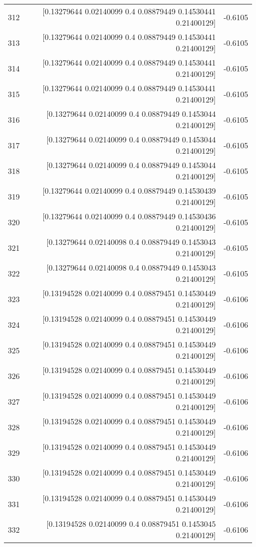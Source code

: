 \begin{longtable}{lrr}
312 & [0.13279644 0.02140099 0.4        0.08879449 0.14530441 0.21400129] & -0.6105 \\
313 & [0.13279644 0.02140099 0.4        0.08879449 0.14530441 0.21400129] & -0.6105 \\
314 & [0.13279644 0.02140099 0.4        0.08879449 0.14530441 0.21400129] & -0.6105 \\
315 & [0.13279644 0.02140099 0.4        0.08879449 0.14530441 0.21400129] & -0.6105 \\
316 & [0.13279644 0.02140099 0.4        0.08879449 0.1453044  0.21400129] & -0.6105 \\
317 & [0.13279644 0.02140099 0.4        0.08879449 0.1453044  0.21400129] & -0.6105 \\
318 & [0.13279644 0.02140099 0.4        0.08879449 0.1453044  0.21400129] & -0.6105 \\
319 & [0.13279644 0.02140099 0.4        0.08879449 0.14530439 0.21400129] & -0.6105 \\
320 & [0.13279644 0.02140099 0.4        0.08879449 0.14530436 0.21400129] & -0.6105 \\
321 & [0.13279644 0.02140098 0.4        0.08879449 0.1453043  0.21400129] & -0.6105 \\
322 & [0.13279644 0.02140098 0.4        0.08879449 0.1453043  0.21400129] & -0.6105 \\
323 & [0.13194528 0.02140099 0.4        0.08879451 0.14530449 0.21400129] & -0.6106 \\
324 & [0.13194528 0.02140099 0.4        0.08879451 0.14530449 0.21400129] & -0.6106 \\
325 & [0.13194528 0.02140099 0.4        0.08879451 0.14530449 0.21400129] & -0.6106 \\
326 & [0.13194528 0.02140099 0.4        0.08879451 0.14530449 0.21400129] & -0.6106 \\
327 & [0.13194528 0.02140099 0.4        0.08879451 0.14530449 0.21400129] & -0.6106 \\
328 & [0.13194528 0.02140099 0.4        0.08879451 0.14530449 0.21400129] & -0.6106 \\
329 & [0.13194528 0.02140099 0.4        0.08879451 0.14530449 0.21400129] & -0.6106 \\
330 & [0.13194528 0.02140099 0.4        0.08879451 0.14530449 0.21400129] & -0.6106 \\
331 & [0.13194528 0.02140099 0.4        0.08879451 0.14530449 0.21400129] & -0.6106 \\
332 & [0.13194528 0.02140099 0.4        0.08879451 0.1453045  0.21400129] & -0.6106 \\

\end{longtable}
